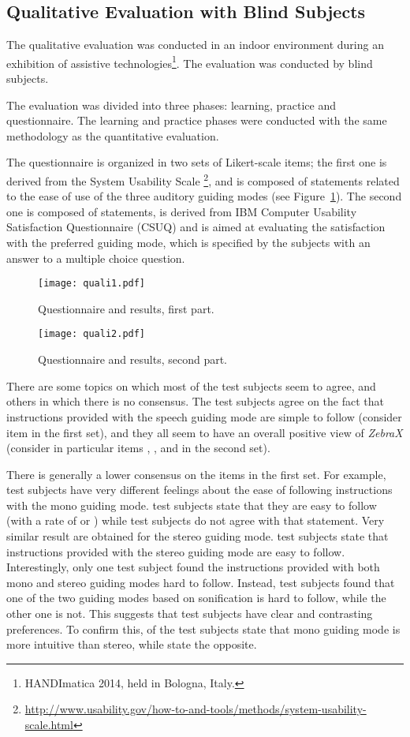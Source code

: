 \documentclass{article}
\newcommand{\zebra}{\emph{ZebraX}}
\begin{document}
\subsection{Qualitative Evaluation with Blind Subjects}
\label{sub:qualitative}
The qualitative evaluation was conducted in an indoor environment during an exhibition of assistive technologies\footnote{HANDImatica 2014, held in Bologna, Italy.}.
The evaluation was conducted by  blind subjects.

The evaluation was divided into three phases: learning, practice and questionnaire. The learning and practice phases were conducted with the same methodology as the quantitative evaluation.

The questionnaire is organized in two sets of Likert-scale items; the first one is derived from the System Usability Scale
\footnote{\url{http://www.usability.gov/how-to-and-tools/methods/system-usability-scale.html}},
and is composed of  statements related to the ease of use of the three auditory guiding modes (see  Figure~\ref{fig:quali1}).
The second one is composed of  statements, is derived from IBM Computer Usability Satisfaction Questionnaire (CSUQ) \cite{lewis1995ibm} and is aimed at evaluating the satisfaction with the preferred guiding mode, which is specified by the subjects with an answer to a multiple choice question.

\begin{figure}[t!]
	\centering
		\texttt{[image: quali1.pdf]}
	\caption[]{Questionnaire and results, first part.}
	\label{fig:quali1}
\end{figure}

\begin{figure}[t!]
	\centering
		\texttt{[image: quali2.pdf]}
	\caption[]{Questionnaire and results, second part.}
	\label{fig:quali2}
\end{figure}

There are some topics on which most of the test subjects seem to agree, and others in which there is no consensus.
The test subjects agree on the fact that instructions provided with the speech guiding mode are simple to follow (consider item  in the first set), and they all seem to have an overall positive view of \zebra{} (consider in particular items , ,  and  in the second set).

There is generally a lower consensus on the items in the first set. For example, test subjects have very different feelings about the ease of following instructions with the mono guiding mode.  test subjects state that they are easy to follow (with a rate of  or ) while  test subjects do not agree with that statement.
Very similar result are obtained for the stereo guiding mode.  test subjects state that instructions provided with the stereo guiding mode are easy to follow.
Interestingly, only one test subject found the instructions provided with both mono and stereo guiding modes hard to follow. Instead,  test subjects found that one of the two guiding modes based on sonification is hard to follow, while the other one is not. This suggests that test subjects have clear and contrasting preferences. To confirm this,  of the test subjects state that mono guiding mode is more intuitive than stereo, while  state the opposite.
\end{document}
